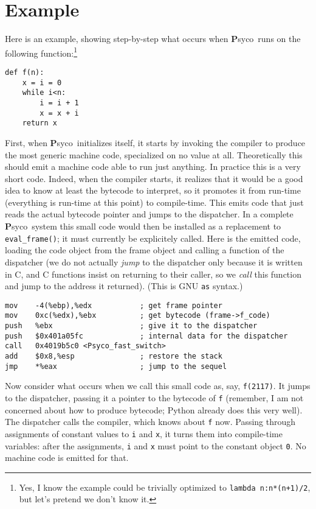 \documentclass{article}
\def\Psyco{{\bf P}syco}
\def\code#1{\texttt{#1}}
\begin{document}
\section{Example}


Here is an example, showing step-by-step what occurs when \Psyco\ runs on the following function:\footnote{Yes, I know the example could be trivially optimized to \code{lambda n:n*(n+1)/2}, but let's pretend we don't know it.}

\begin{verbatim}
def f(n):
    x = i = 0
    while i<n:
        i = i + 1
        x = x + i
    return x
\end{verbatim}

First, when \Psyco\ initializes itself, it starts by invoking the compiler to produce the most generic machine code, specialized on no value at all. Theoretically this should emit a machine code able to run just anything. In practice this is a very short code. Indeed, when the compiler starts, it realizes that it would be a good idea to know at least the bytecode to interpret, so it promotes it from run-time (everything is run-time at this point) to compile-time. This emits code that just reads the actual bytecode pointer and jumps to the dispatcher. In a complete \Psyco\ system this small code would then be installed as a replacement to \code{eval\_frame()}; it must currently be explicitely called. Here is the emitted code, loading the code object from the frame object and calling a function of the dispatcher (we do not actually \emph{jump} to the dispatcher only because it is written in C, and C functions insist on returning to their caller, so we \emph{call} this function and jump to the address it returned). (This is GNU \code{as} syntax.)

\begin{verbatim}
mov    -4(%ebp),%edx           ; get frame pointer
mov    0xc(%edx),%ebx          ; get bytecode (frame->f_code)
push   %ebx                    ; give it to the dispatcher
push   $0x401a05fc             ; internal data for the dispatcher
call   0x4019b5c0 <Psyco_fast_switch>
add    $0x8,%esp               ; restore the stack
jmp    *%eax                   ; jump to the sequel
\end{verbatim}

Now consider what occurs when we call this small code as, say, \code{f(2117)}. It jumps to the dispatcher, passing it a pointer to the bytecode of \code{f} (remember, I am not concerned about how to produce bytecode; Python already does this very well). The dispatcher calls the compiler, which knows about \code{f} now. Passing through assignments of constant values to \code{i} and \code{x}, it turns them into compile-time variables: after the assignments, \code{i} and \code{x} must point to the constant object \code{0}. No machine code is emitted for that.
\end{document}

